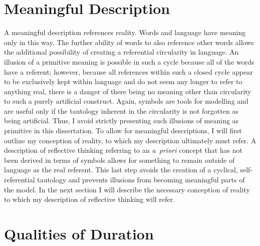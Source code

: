 \section{Meaningful Description}

A meaningful description references reality.  Words and language have
meaning only in this way.  The further ability of words to also
reference other words allows the additional possibility of creating a
referential circularity in language.  An illusion of a primitive
meaning is possible in such a cycle because all of the words have a
referent; however, because all references within such a closed cycle
appear to be exclusively kept within language and do not seem any
longer to refer to anything real, there is a danger of there being no
meaning other than circularity to such a purely artificial construct.
Again, symbols are tools for modelling and are useful only if the
tautology inherent in the circularity is not forgotten as being
artificial.  Thus, I avoid strictly presenting such illusions of
meaning as primitive in this dissertation.  To allow for meaningful
descriptions, I will first outline my conception of reality, to which
my description ultimately must refer.  A description of reflective
thinking referring to an \emph{a~priori} concept that has not been
derived in terms of symbols allows for something to remain outside of
language as the real referent.  This last step avoids the creation of
a cyclical, self-referential tautology and prevents illusions from
becoming meaningful parts of the model.  In the next section I will
describe the necessary conception of reality to which my description
of reflective thinking will refer.

\section{Qualities of Duration}

